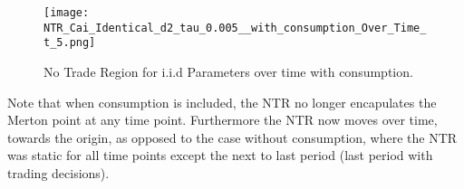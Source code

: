 \documentclass[11pt]{article}
\begin{document}
\begin{figure}[!ht]
    \centering
    \texttt{[image: NTR\_Cai\_Identical\_d2\_tau\_0.005\_\_with\_consumption\_Over\_Time\_t\_5.png]}
    \caption{No Trade Region for i.i.d Parameters over time with consumption.}
    \label{fig:NTR_2d_iid_with_consumption_over_time}
\end{figure}
Note that when consumption is included, the \ac{NTR} no longer encapulates the Merton point at any time point.
Furthermore the \ac{NTR} now moves over time, towards the origin, as opposed to the case without consumption,
where the \ac{NTR} was static for all time points except the next to last period (last period with trading decisions).

\ifdefined\COMPILINGMAIN
\else
\end{document}
